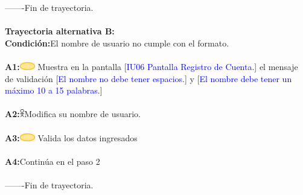         -------Fin de  trayectoria. \\\\

                    \textbf{Trayectoria alternativa B:}\\
                        \textbf{Condición:}El nombre de usuario no cumple con el formato.\\\\
                        \textbf{A1:}\includegraphics[width=0.0500\textwidth]{Figuras/sistema.png} Muestra en la pantalla [\textcolor{blue}{IU06 Pantalla Registro de Cuenta}.] el mensaje de validación [\textcolor{blue}{El nombre no debe tener espacios}.] y  [\textcolor{blue}{El nombre debe tener un máximo 10 a 15 palabras}.]\\\\ 
                        \textbf{A2:}\includegraphics[width=0.0150\textwidth]{Figuras/persona.png}Modifica su nombre de usuario.\\\\
                        \textbf{A3:}\includegraphics[width=0.0500\textwidth]{Figuras/sistema.png} Valida los datos ingresados\\\\
                        \textbf{A4:}Continúa en el paso 2 \\\\
       
        -------Fin de  trayectoria. \\\\

